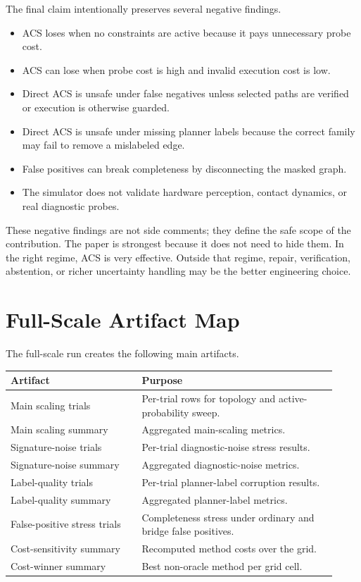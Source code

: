 \documentclass{article}
\newcommand{\ACS}{\textsc{ACS}}
\begin{document}
The final claim intentionally preserves several negative findings.
\begin{itemize}
    \item \ACS{} loses when no constraints are active because it pays unnecessary probe cost.
    \item \ACS{} can lose when probe cost is high and invalid execution cost is low.
    \item Direct \ACS{} is unsafe under false negatives unless selected paths are verified or execution is otherwise guarded.
    \item Direct \ACS{} is unsafe under missing planner labels because the correct family may fail to remove a mislabeled edge.
    \item False positives can break completeness by disconnecting the masked graph.
    \item The simulator does not validate hardware perception, contact dynamics, or real diagnostic probes.
\end{itemize}
These negative findings are not side comments; they define the safe scope of the contribution. The paper is strongest because it does not need to hide them. In the right regime, \ACS{} is very effective. Outside that regime, repair, verification, abstention, or richer uncertainty handling may be the better engineering choice.

\section{Full-Scale Artifact Map}

The full-scale run creates the following main artifacts.
\begin{center}
\footnotesize
\begin{tabular}{p{0.37\linewidth}p{0.55\linewidth}}
\toprule
Artifact & Purpose \\
\midrule
Main scaling trials & Per-trial rows for topology and active-probability sweep. \\
Main scaling summary & Aggregated main-scaling metrics. \\
Signature-noise trials & Per-trial diagnostic-noise stress results. \\
Signature-noise summary & Aggregated diagnostic-noise metrics. \\
Label-quality trials & Per-trial planner-label corruption results. \\
Label-quality summary & Aggregated planner-label metrics. \\
False-positive stress trials & Completeness stress under ordinary and bridge false positives. \\
Cost-sensitivity summary & Recomputed method costs over the grid. \\
Cost-winner summary & Best non-oracle method per grid cell. \\
\bottomrule
\end{tabular}
\end{center}
\end{document}
